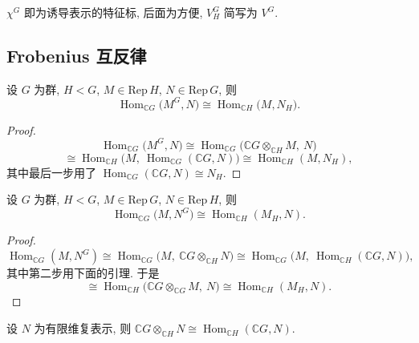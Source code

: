 \begin{remark}\label{rem:induced-character-notation}
$\chi^G$ 即为诱导表示的特征标, 后面为方便, $V_H^G$ 简写为 $V^G$.
\end{remark}

\subsection{Frobenius 互反律}

\begin{theorem}\label{thm:frobenius-reciprocity-1}
设 $G$ 为群, $H<G$, $M\in\mathrm{Rep}\,H$, $N\in\mathrm{Rep}\,G$, 则
\[
  \operatorname{Hom}_{\mathbb{C}G}\bigl(M^G,N\bigr)\cong\operatorname{Hom}_{\mathbb{C}H}\bigl(M,N_H\bigr).
\]
\end{theorem}

\begin{proof}
\[
  \operatorname{Hom}_{\mathbb{C}G}\bigl(M^G,N\bigr)
  \cong\operatorname{Hom}_{\mathbb{C}G}\bigl(\mathbb{C}G\otimes_{\mathbb{C}H}M,\ N\bigr)
\]
\[
  \cong\operatorname{Hom}_{\mathbb{C}H}\bigl(M,\ \operatorname{Hom}_{\mathbb{C}G}(\mathbb{C}G,N)\bigr)
  \cong\operatorname{Hom}_{\mathbb{C}H}(M,N_H),
\]
其中最后一步用了 $\operatorname{Hom}_{\mathbb{C}G}(\mathbb{C}G,N)\cong N_H$.
\end{proof}

\begin{theorem}\label{thm:frobenius-reciprocity-2}
设 $G$ 为群, $H<G$, $M\in\mathrm{Rep}\,G$, $N\in\mathrm{Rep}\,H$, 则
\[
  \operatorname{Hom}_{\mathbb{C}G}\bigl(M,N^G\bigr)\cong\operatorname{Hom}_{\mathbb{C}H}(M_H,N).
\]
\end{theorem}

\begin{proof}
\[
  \operatorname{Hom}_{\mathbb{C}G}(M,N^G)\cong\operatorname{Hom}_{\mathbb{C}G}\bigl(M,\ \mathbb{C}G\otimes_{\mathbb{C}H}N\bigr)
  \cong\operatorname{Hom}_{\mathbb{C}G}\bigl(M,\ \operatorname{Hom}_{\mathbb{C}H}(\mathbb{C}G,N)\bigr),
\]
其中第二步用下面的引理. 于是
\[
  \cong\operatorname{Hom}_{\mathbb{C}H}\bigl(\mathbb{C}G\otimes_{\mathbb{C}G}M,\ N\bigr)
  \cong\operatorname{Hom}_{\mathbb{C}H}(M_H,N).
\]
\end{proof}

\begin{lemma}\label{lem:tensor-hom-dual}
设 $N$ 为有限维复表示, 则
$\mathbb{C}G\otimes_{\mathbb{C}H}N\cong\operatorname{Hom}_{\mathbb{C}H}(\mathbb{C}G,N)$.
\end{lemma}

